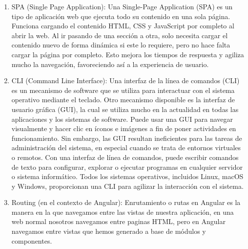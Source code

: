 \begin{enumerate}
    \item SPA (Single Page Application): Una Single-Page Application (SPA) es un tipo de aplicación web que ejecuta todo su contenido en una sola página. 
    Funciona cargando el contenido HTML, CSS y JavaScript por completo al abrir la web. Al ir pasando de una sección a otra, solo necesita cargar el contenido nuevo de forma dinámica si este lo requiere, pero no hace falta cargar la página por completo. Esto mejora los tiempos de respuesta y agiliza mucho la navegación, favoreciendo así a la experiencia de usuario.\citep{digital55QuSinglePage}
    \item CLI (Command Line Interface): Una interfaz de la línea de comandos (CLI) es un mecanismo de software que se utiliza para interactuar con el sistema operativo mediante el teclado. Otro mecanismo disponible es la interfaz de usuario gráfica (GUI), la cual se utiliza mucho en la actualidad en todas las aplicaciones y los sistemas de software. Puede usar una GUI para navegar visualmente y hacer clic en íconos e imágenes a fin de poner actividades en funcionamiento. Sin embargo, las GUI resultan ineficientes para las tareas de administración del sistema, en especial cuando se trata de entornos virtuales o remotos. Con una interfaz de línea de comandos, puede escribir comandos de texto para configurar, explorar o ejecutar programas en cualquier servidor o sistema informático. Todos los sistemas operativos, incluidos Linux, macOS y Windows, proporcionan una CLI para agilizar la interacción con el sistema.\citep{amazonQuCLI}
    \item Routing (en el contexto de Angular): Enrutamiento o rutas en Angular es la manera en la que navegamos entre las vistas de nuestra aplicación, en una web normal nosotros navegamos entre paginas HTML, pero en Angular navegamos entre vistas que hemos generado a base de módulos y componentes.\citep{mediumEnrutamientoAngular}
\end{enumerate}






%
%
%
%
%
%
%
